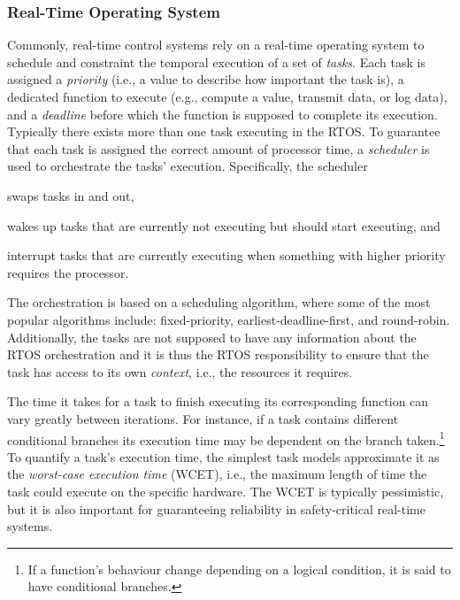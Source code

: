 \subsubsection{Real-Time Operating System}%
%
Commonly, real-time control systems rely on a real-time operating system to schedule and constraint the temporal execution of a set of \emph{tasks}.
Each task is assigned a \emph{priority} (i.e., a value to describe how important the task is), a dedicated function to execute (e.g., compute a value, transmit data, or log data), and a \emph{deadline} before which the function is supposed to complete its execution.
Typically there exists more than one task executing in the RTOS.
To guarantee that each task is assigned the correct amount of processor time, a \emph{scheduler} is used to orchestrate the tasks' execution.
Specifically, the scheduler
\begin{enumerate*}[label = (\roman*)]
    \item swaps tasks in and out,
    \item wakes up tasks that are currently not executing but should start executing, and
    \item interrupt tasks that are currently executing when something with higher priority requires the processor.
\end{enumerate*}
The orchestration is based on a scheduling algorithm, where some of the most popular algorithms include: fixed-priority, earliest-deadline-first, and round-robin.
Additionally, the tasks are not supposed to have any information about the RTOS orchestration and it is thus the RTOS responsibility to ensure that the task has access to its own \emph{context}, i.e., the resources it requires. 

The time it takes for a task to finish executing its corresponding function can vary greatly between iterations.
For instance, if a task contains different conditional branches its execution time may be dependent on the branch taken.\footnote{If a function's behaviour change depending on a logical condition, it is said to have conditional branches.}
To quantify a task's execution time, the simplest task models approximate it as the \emph{worst-case execution time} (WCET), i.e., the maximum length of time the task could execute on the specific hardware.
The WCET is typically pessimistic, but it is also important for guaranteeing reliability in safety-critical real-time systems.


